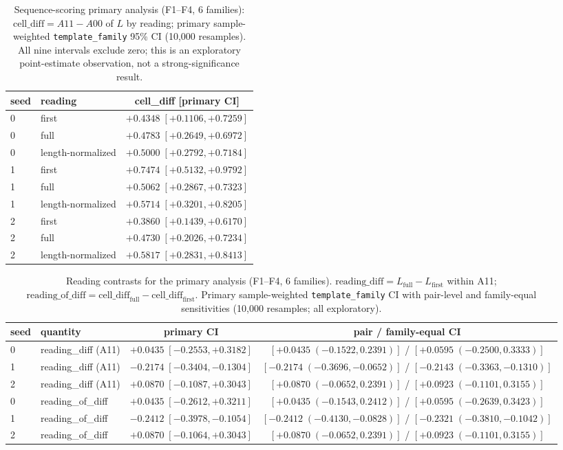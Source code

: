 \documentclass[11pt,twocolumn]{article}
\begin{document}
\begin{table}[t]
\centering
\caption{Sequence-scoring primary analysis (F1--F4, 6 families):
$\mathrm{cell\_diff}=A11-A00$ of $L$ by reading; primary
sample-weighted \texttt{template\_family} 95\% CI (10{,}000 resamples).
All nine intervals exclude zero; this is an exploratory point-estimate
observation, not a strong-significance result.}
\label{tab:seqcell}
\begin{tabular}{llc}
\toprule
seed & reading & cell\_diff [primary CI] \\
\midrule
0 & first & $+0.4348\;[+0.1106,+0.7259]$ \\
0 & full & $+0.4783\;[+0.2649,+0.6972]$ \\
0 & length-normalized & $+0.5000\;[+0.2792,+0.7184]$ \\
1 & first & $+0.7474\;[+0.5132,+0.9792]$ \\
1 & full & $+0.5062\;[+0.2867,+0.7323]$ \\
1 & length-normalized & $+0.5714\;[+0.3201,+0.8205]$ \\
2 & first & $+0.3860\;[+0.1439,+0.6170]$ \\
2 & full & $+0.4730\;[+0.2026,+0.7234]$ \\
2 & length-normalized & $+0.5817\;[+0.2831,+0.8413]$ \\
\bottomrule
\end{tabular}
\end{table}

\begin{table}[t]
\centering
\caption{Reading contrasts for the primary analysis (F1--F4, 6 families).
$\mathrm{reading\_diff}=L_{\mathrm{full}}-L_{\mathrm{first}}$ within A11;
$\mathrm{reading\_of\_diff}=\mathrm{cell\_diff}_{\mathrm{full}}-\mathrm{cell\_diff}_{\mathrm{first}}$.
Primary sample-weighted \texttt{template\_family} CI with pair-level and
family-equal sensitivities (10{,}000 resamples; all exploratory).}
\label{tab:seqdiff}
\begin{tabular}{llcc}
\toprule
seed & quantity & primary CI & pair / family-equal CI \\
\midrule
0 & reading\_diff (A11) & $+0.0435\;[-0.2553,+0.3182]$ & $[+0.0435\;(-0.1522,0.2391)]$ / $[+0.0595\;(-0.2500,0.3333)]$ \\
1 & reading\_diff (A11) & $-0.2174\;[-0.3404,-0.1304]$ & $[-0.2174\;(-0.3696,-0.0652)]$ / $[-0.2143\;(-0.3363,-0.1310)]$ \\
2 & reading\_diff (A11) & $+0.0870\;[-0.1087,+0.3043]$ & $[+0.0870\;(-0.0652,0.2391)]$ / $[+0.0923\;(-0.1101,0.3155)]$ \\
0 & reading\_of\_diff & $+0.0435\;[-0.2612,+0.3211]$ & $[+0.0435\;(-0.1543,0.2412)]$ / $[+0.0595\;(-0.2639,0.3423)]$ \\
1 & reading\_of\_diff & $-0.2412\;[-0.3978,-0.1054]$ & $[-0.2412\;(-0.4130,-0.0828)]$ / $[-0.2321\;(-0.3810,-0.1042)]$ \\
2 & reading\_of\_diff & $+0.0870\;[-0.1064,+0.3043]$ & $[+0.0870\;(-0.0652,0.2391)]$ / $[+0.0923\;(-0.1101,0.3155)]$ \\
\bottomrule
\end{tabular}
\end{table}
\end{document}
